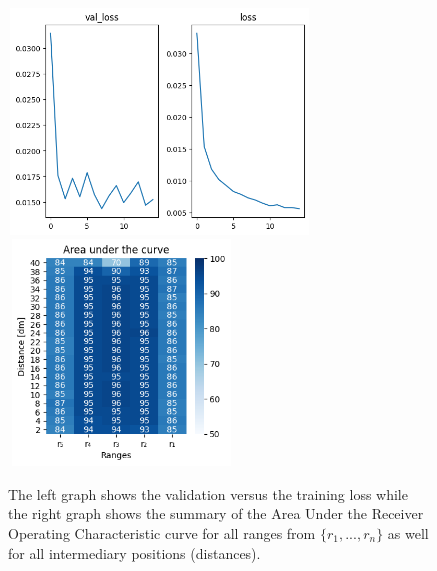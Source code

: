\begin{multicols}{2}
\begin{itemize}
\end{itemize}
\end{multicols}\begin{figure}[H]%
\centering
\includegraphics[width=8cm,height=6cm]{3_models/models_49/graph_49.png}
\hspace{0.2 cm}
\includegraphics[width=6cm,height=6cm]{4_plots/plots_49/AUC_49.png}
\caption{The left graph shows the validation versus the training loss while the right graph shows the summary of the Area Under the Receiver Operating Characteristic curve for all ranges from $\{r_{1}, ... ,r_{n}\}$ as well for all intermediary positions (distances).}
\label{auc_49}
\end{figure}

\newpage
